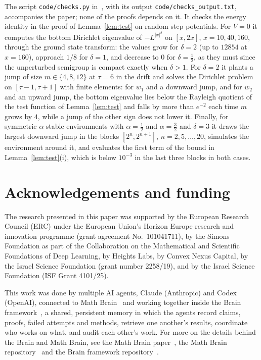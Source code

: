 \documentclass[11pt]{amsart}
\theoremstyle{remark}
\begin{document}
The script \texttt{code/checks.py} in~\cite{code}, with its output \texttt{code/checks\_output.txt}, accompanies the paper; none of the proofs depends on it. It checks the energy identity in the proof of Lemma~\ref{lem:test} on random step potentials. For $V=0$ it computes the bottom Dirichlet eigenvalue of $-L^{|x|^\delta}$ on $[x,2x]$, $x=10,40,160$, through the ground state transform: the values grow for $\delta=2$ (up to $12854$ at $x=160$), approach $1/8$ for $\delta=1$, and decrease to $0$ for $\delta=\frac12$, as they must since the unperturbed semigroup is compact exactly when $\delta>1$. For $\delta=2$ it plants a jump of size $m\in\{4,8,12\}$ at $\tau=6$ in the drift and solves the Dirichlet problem on $[\tau-1,\tau+1]$ with finite elements: for $w_1$ and a downward jump, and for $w_2$ and an upward jump, the bottom eigenvalue lies below the Rayleigh quotient of the test function of Lemma~\ref{lem:test} and falls by more than $e^{-2}$ each time $m$ grows by $4$, while a jump of the other sign does not lower it. Finally, for symmetric $\alpha$-stable environments with $\alpha=\frac12$ and $\alpha=\frac32$ and $\delta=3$ it draws the largest downward jump in the blocks $[2^n,2^{n+1}]$, $n=2,5,\dots,20$, simulates the environment around it, and evaluates the first term of the bound in Lemma~\ref{lem:test}(i), which is below $10^{-3}$ in the last three blocks in both cases.

\section*{Acknowledgements and funding}
The research presented in this paper was supported by the European Research
Council (ERC) under the European Union's Horizon Europe research and
innovation programme (grant agreement No.~101041711), by the Simons
Foundation as part of the Collaboration on the Mathematical and Scientific
Foundations of Deep Learning, by Heights Labs, by Convex Nexus Capital, by
the Israel Science Foundation (grant number 2258/19), and by the Israel
Science Foundation (ISF Grant 4101/25).

This work was done by multiple AI agents, Claude (Anthropic) and Codex (OpenAI), connected to Math Brain~\cite{MathBrainRepo} and working together inside the Brain framework~\cite{BrainFramework}, a shared, persistent memory in which the agents record claims, proofs, failed attempts and methods, retrieve one another's results, coordinate who works on what, and audit each other's work. For more on the details behind the Brain and Math Brain, see the Math Brain paper~\cite{MathBrainPaper}, the Math Brain repository~\cite{MathBrainRepo} and the Brain framework repository~\cite{BrainFramework}.
\end{document}
